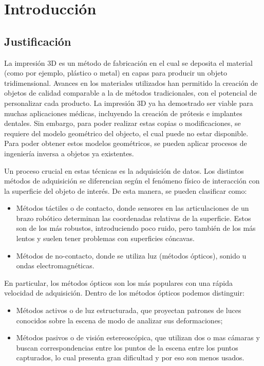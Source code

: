 \chapter{Introducción}
	\section{Justificación}
	La impresión 3D es un método de fabricación en el cual se deposita el material (como por ejemplo, plástico o metal) en capas para producir un objeto tridimensional.
	Avances en los materiales utilizados han permitido la creación de objetos de calidad comparable a la de métodos tradicionales, con el potencial de personalizar cada producto.
	La impresión 3D ya ha demostrado ser viable para muchas aplicaciones médicas, incluyendo la creación de prótesis e implantes dentales\cite{Schubert159}. %
	Sin embargo, para poder realizar estas copias o modificaciones,
	se requiere del modelo geométrico del objecto, el cual puede no estar disponible.
	Para poder obtener estos modelos geométricos,
	se pueden aplicar procesos de ingeniería inversa a objetos ya existentes.

	Un proceso crucial en estas técnicas es la adquisición de datos.
	Los distintos métodos de adquisición se diferencian según el fenómeno físico de interacción con la superficie del objeto de interés.
	De esta manera, se pueden clasificar como:
	\begin{itemize}
		\item Métodos táctiles o de contacto, donde sensores en las articulaciones de un brazo robótico determinan las coordenadas relativas de la superficie. Estos son de los más robustos, introduciendo poco ruido, pero también de los más lentos y suelen tener problemas con superficies cóncavas.
		\item Métodos de no-contacto, donde se utiliza luz (métodos ópticos), sonido u ondas electromagnéticas.
	\end{itemize}
	En particular, los métodos ópticos son los más populares con una rápida velocidad de adquisición\cite{Várady97reverseengineering}. %
	Dentro de los métodos ópticos podemos distinguir:
	\begin{itemize}
		\item Métodos activos o de luz estructurada,
			que proyectan patrones de luces conocidos sobre la escena de modo de analizar sus deformaciones;
		\item Métodos pasivos o de visión estereoscópica,
			que utilizan dos o mas cámaras y buscan correspondencias
			entre los puntos de la escena entre los puntos capturados,
			lo cual presenta gran dificultad y por eso son menos usados\cite{Várady97reverseengineering}.%
	\end{itemize}

